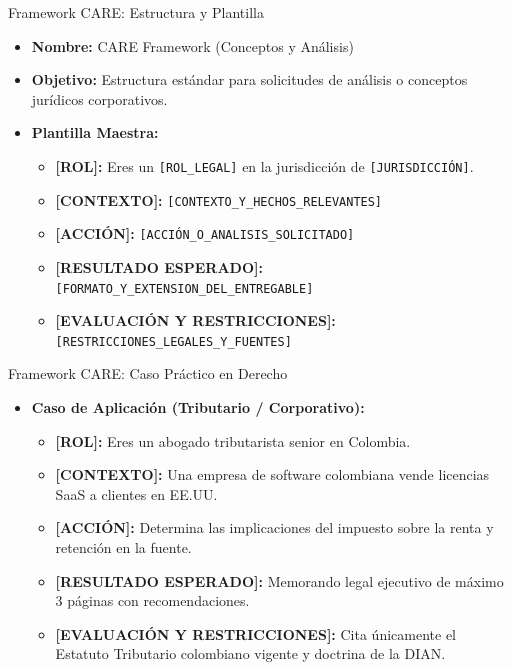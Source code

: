 \documentclass[aspectratio=169]{beamer}
\begin{document}
\begin{frame}{Framework CARE: Estructura y Plantilla}


\begin{itemize}
  \item \textbf{Nombre:} CARE Framework (Conceptos y Análisis)
  \item \textbf{Objetivo:} Estructura estándar para solicitudes de análisis o conceptos jurídicos corporativos.
  \item \textbf{Plantilla Maestra:}
  \begin{itemize}
    \item \textbf{[ROL]:} Eres un \texttt{[ROL\_LEGAL]} en la jurisdicción de \texttt{[JURISDICCIÓN]}.
    \item \textbf{[CONTEXTO]:} \texttt{[CONTEXTO\_Y\_HECHOS\_RELEVANTES]}
    \item \textbf{[ACCIÓN]:} \texttt{[ACCIÓN\_O\_ANALISIS\_SOLICITADO]}
    \item \textbf{[RESULTADO ESPERADO]:} \texttt{[FORMATO\_Y\_EXTENSION\_DEL\_ENTREGABLE]}
    \item \textbf{[EVALUACIÓN Y RESTRICCIONES]:} \texttt{[RESTRICCIONES\_LEGALES\_Y\_FUENTES]}
  \end{itemize}
\end{itemize}
\end{frame}

\begin{frame}{Framework CARE: Caso Práctico en Derecho}


\begin{itemize}
  \item \textbf{Caso de Aplicación (Tributario / Corporativo):}
  \begin{itemize}
    \item \textbf{[ROL]:} Eres un abogado tributarista senior en Colombia.
    \item \textbf{[CONTEXTO]:} Una empresa de software colombiana vende licencias SaaS a clientes en EE.UU.
    \item \textbf{[ACCIÓN]:} Determina las implicaciones del impuesto sobre la renta y retención en la fuente.
    \item \textbf{[RESULTADO ESPERADO]:} Memorando legal ejecutivo de máximo 3 páginas con recomendaciones.
    \item \textbf{[EVALUACIÓN Y RESTRICCIONES]:} Cita únicamente el Estatuto Tributario colombiano vigente y doctrina de la DIAN.
  \end{itemize}
\end{itemize}
\end{frame}
\end{document}

